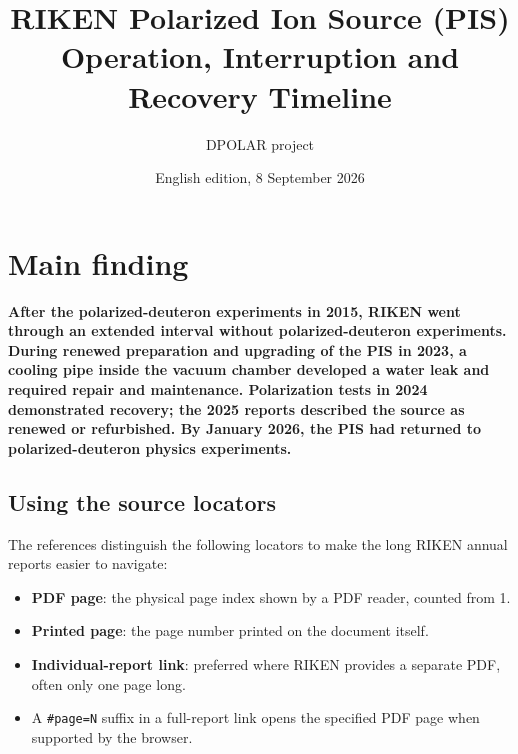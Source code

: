 \documentclass[11pt,a4paper]{article}
\title{RIKEN Polarized Ion Source (PIS)\\[4pt]\large Operation, Interruption and Recovery Timeline}
\author{DPOLAR project}
\date{English edition, 8 September 2026}
\begin{document}
\maketitle

\section{Main finding}
\textbf{After the polarized-deuteron experiments in 2015, RIKEN went through an extended interval without polarized-deuteron experiments. During renewed preparation and upgrading of the PIS in 2023, a cooling pipe inside the vacuum chamber developed a water leak and required repair and maintenance. Polarization tests in 2024 demonstrated recovery; the 2025 reports described the source as renewed or refurbished. By January 2026, the PIS had returned to polarized-deuteron physics experiments.}

\subsection*{Using the source locators}
The references distinguish the following locators to make the long RIKEN annual reports easier to navigate:
\begin{itemize}[leftmargin=1.5em]
\item \textbf{PDF page}: the physical page index shown by a PDF reader, counted from 1.
\item \textbf{Printed page}: the page number printed on the document itself.
\item \textbf{Individual-report link}: preferred where RIKEN provides a separate PDF, often only one page long.
\item A \texttt{\#page=N} suffix in a full-report link opens the specified PDF page when supported by the browser.
\end{itemize}
\end{document}
